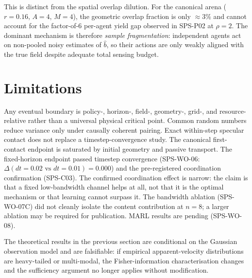 \documentclass{article}
\begin{document}
This is distinct from the spatial overlap dilution.  For the canonical arena
($r=0.16$, $A=4$, $M=4$), the geometric overlap fraction is only $\approx 3\%$
and cannot account for the factor-of-6 per-agent yield gap observed in SPS-P02
at $\rho=2$.  The dominant mechanism is therefore \emph{sample fragmentation}:
independent agents act on non-pooled noisy estimates of $\hat{b}$, so their
actions are only weakly aligned with the true field despite adequate total sensing
budget.

\section{Limitations}

Any eventual boundary is policy-, horizon-, field-, geometry-, grid-, and
resource-relative rather than a universal physical critical point. Common
random numbers reduce variance only under causally coherent pairing. Exact
within-step specular contact does not replace a timestep-convergence study.
The canonical first-contact endpoint is saturated by initial geometry and
passive transport. The fixed-horizon endpoint passed timestep convergence
(SPS-WO-06: $\Delta(dt{=}0.02\text{ vs }dt{=}0.01)=0.000$) and the
pre-registered coordination confirmation (SPS-C03). The confirmed coordination
effect is narrow: the claim is that a fixed low-bandwidth channel helps at
all, not that it is the optimal mechanism or that learning cannot surpass it.
The bandwidth ablation (SPS-WO-07C) did not cleanly isolate the content
contribution at $n=8$; a larger ablation may be required for publication.
MARL results are pending (SPS-WO-08).

The theoretical results in the previous section are conditional on the Gaussian
observation model and are falsifiable: if empirical apparent-velocity distributions
are heavy-tailed or multi-modal, the Fisher-information characterisation changes
and the sufficiency argument no longer applies without modification.
\end{document}

